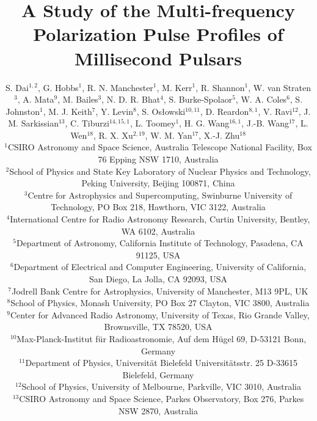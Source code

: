 \documentclass[useAMS,usenatbib]{mn2e}
\begin{document}
\title[A Study of the Multi-frequency Polarization Pulse Profiles of Millisecond Pulsars]{A Study of the Multi-frequency Polarization Pulse Profiles of Millisecond Pulsars}
\author[S. Dai et al.]{S. Dai$^{1,2}$, G. Hobbs$^1$, R. N. Manchester$^1$, M. Kerr$^1$, R. Shannon$^1$, W. van Straten$^3$,   
\newauthor A. Mata$^9$, M. Bailes$^3$, N. D. R. Bhat$^4$, S. Burke-Spolaor$^5$, W. A. Coles$^6$, S. Johnston$^1$, 
\newauthor M. J. Keith$^7$, Y. Levin$^8$, S. Os\l owski$^{10,11}$, D. Reardon$^{8,1}$, V. Ravi$^{12}$, J. M. Sarkissian$^{13}$, 
\newauthor C. Tiburzi$^{14,15,1}$, L. Toomey$^{1}$, H. G. Wang$^{16,1}$, J.-B. Wang$^{17}$, L. Wen$^{18}$, R. X. Xu$^{2,19}$, 
\newauthor W. M. Yan$^{17}$, X.-J. Zhu$^{18}$\\
$^1$CSIRO Astronomy and Space Science, Australia Telescope National Facility, Box 76 Epping NSW 1710, Australia\\
$^2$School of Physics and State Key Laboratory of Nuclear Physics and Technology, Peking University, Beijing 100871, China\\
$^3$Centre for Astrophysics and Supercomputing, Swinburne University of Technology, PO Box 218, Hawthorn, VIC 3122, Australia\\
$^4$International Centre for Radio Astronomy Research, Curtin University, Bentley, WA 6102, Australia\\
$^5$Department of Astronomy, California Institute of Technology, Pasadena, CA 91125, USA\\
$^6$Department of Electrical and Computer Engineering, University of California, San Diego, La Jolla, CA 92093, USA\\
$^7$Jodrell Bank Centre for Astrophysics, University of Manchester, M13 9PL, UK\\
$^8$School of Physics, Monash University, PO Box 27 Clayton, VIC 3800, Australia\\
$^9$Center for Advanced Radio Astronomy, University of Texas, Rio Grande Valley, Brownsville, TX 78520, USA\\
$^{10}$Max-Planck-Institut f\"{u}r Radioastronomie, Auf dem H\"{u}gel 69, D-53121 Bonn, Germany\\
$^{11}$Department of Physics, Universit\"{a}t Bielefeld Universit\"{a}tsstr. 25 D-33615 Bielefeld, Germany\\
$^{12}$School of Physics, University of Melbourne, Parkville, VIC 3010, Australia\\
$^{13}$CSIRO Astronomy and Space Science, Parkes Observatory, Box 276, Parkes NSW 2870, Australia\\
}
\end{document}
